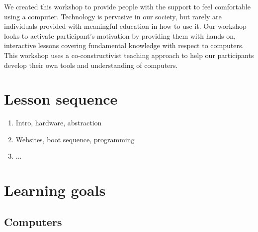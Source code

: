 \documentclass[11pt]{article}
\begin{document}
We created this workshop to provide people with the support to feel comfortable
using a computer. Technology is pervasive in our society, but rarely are
individuals provided with meaningful education in how to use it. Our workshop
looks to activate participant's motivation by providing them with hands on,
interactive lessons covering fundamental knowledge with respect to computers.
This workshop uses a co-constructivist teaching approach to help our
participants develop their own tools and understanding of computers.

\section{Lesson sequence}

\begin{enumerate}
    \setcounter{enumi}{0}
  \item Intro, hardware, abstraction
  \item Websites, boot sequence, programming
  \item ...
\end{enumerate}

\section*{Learning goals}

\subsection*{Computers}
\end{document}
